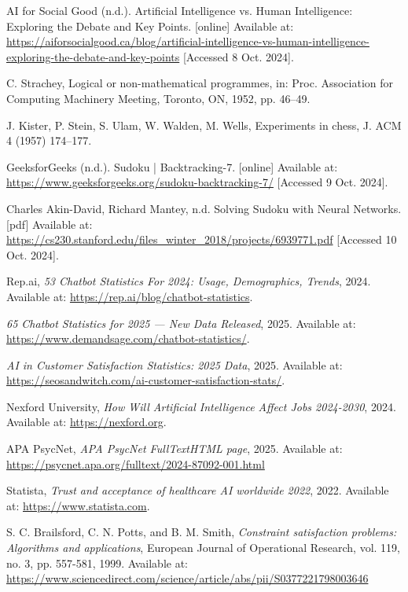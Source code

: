 \documentclass[]{final_report}
\begin{document}
\newpage
\begin{thebibliography}{99}

AI for Social Good (n.d.). Artificial Intelligence vs. Human Intelligence: Exploring the Debate and Key Points. [online] Available at: \url{https://aiforsocialgood.ca/blog/artificial-intelligence-vs-human-intelligence-exploring-the-debate-and-key-points} [Accessed 8 Oct. 2024].

 C. Strachey, Logical or non-mathematical programmes, in: Proc. Association for Computing Machinery Meeting, Toronto, ON, 1952, pp. 46–49.

 J. Kister, P. Stein, S. Ulam, W. Walden, M. Wells, Experiments in chess, J. ACM 4 (1957) 174–177.

 GeeksforGeeks (n.d.). Sudoku | Backtracking-7. [online] Available at: \url{https://www.geeksforgeeks.org/sudoku-backtracking-7/} [Accessed 9 Oct. 2024]. 

 Charles Akin-David, Richard Mantey, n.d. Solving Sudoku with Neural Networks. [pdf] Available at: \url{https://cs230.stanford.edu/files_winter_2018/projects/6939771.pdf} [Accessed 10 Oct. 2024].

 Rep.ai, \textit{53 Chatbot Statistics For 2024: Usage, Demographics, Trends}, 2024. Available at: \url{https://rep.ai/blog/chatbot-statistics}.

 \textit{65 Chatbot Statistics for 2025 — New Data Released}, 2025. Available at: \url{https://www.demandsage.com/chatbot-statistics/}.

 \textit{AI in Customer Satisfaction Statistics: 2025 Data}, 2025. Available at: \url{https://seosandwitch.com/ai-customer-satisfaction-stats/}.

 Nexford University, \textit{How Will Artificial Intelligence Affect Jobs 2024-2030}, 2024. Available at: \url{https://nexford.org}.

 APA PsycNet, \textit{APA PsycNet FullTextHTML page}, 2025. Available at: \url{https://psycnet.apa.org/fulltext/2024-87092-001.html}

 Statista, \textit{Trust and acceptance of healthcare AI worldwide 2022}, 2022. Available at: \url{https://www.statista.com}.

 S. C. Brailsford, C. N. Potts, and B. M. Smith, \textit{Constraint satisfaction problems: Algorithms and applications}, European Journal of Operational Research, vol. 119, no. 3, pp. 557-581, 1999. Available at: \url{https://www.sciencedirect.com/science/article/abs/pii/S0377221798003646}


\end{thebibliography}
\end{document}
